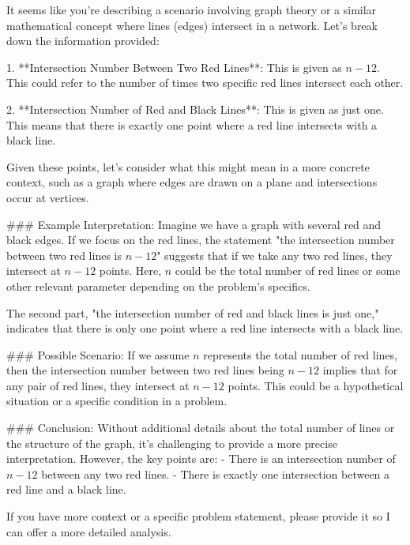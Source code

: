 It seems like you're describing a scenario involving graph theory or a similar mathematical concept where lines (edges) intersect in a network. Let's break down the information provided:

1. **Intersection Number Between Two Red Lines**: This is given as \( n - 12 \). This could refer to the number of times two specific red lines intersect each other.

2. **Intersection Number of Red and Black Lines**: This is given as just one. This means that there is exactly one point where a red line intersects with a black line.

Given these points, let's consider what this might mean in a more concrete context, such as a graph where edges are drawn on a plane and intersections occur at vertices.

### Example Interpretation:
Imagine we have a graph with several red and black edges. If we focus on the red lines, the statement "the intersection number between two red lines is \( n - 12 \)" suggests that if we take any two red lines, they intersect at \( n - 12 \) points. Here, \( n \) could be the total number of red lines or some other relevant parameter depending on the problem's specifics.

The second part, "the intersection number of red and black lines is just one," indicates that there is only one point where a red line intersects with a black line.

### Possible Scenario:
If we assume \( n \) represents the total number of red lines, then the intersection number between two red lines being \( n - 12 \) implies that for any pair of red lines, they intersect at \( n - 12 \) points. This could be a hypothetical situation or a specific condition in a problem.

### Conclusion:
Without additional details about the total number of lines or the structure of the graph, it's challenging to provide a more precise interpretation. However, the key points are:
- There is an intersection number of \( n - 12 \) between any two red lines.
- There is exactly one intersection between a red line and a black line.

If you have more context or a specific problem statement, please provide it so I can offer a more detailed analysis.